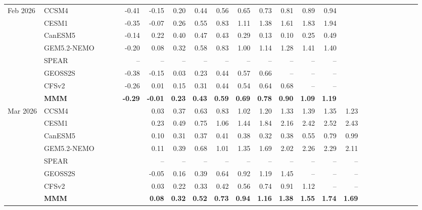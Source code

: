 \documentclass{article}
\begin{document}
\begin{longtable}{llrrrrrrrrrrrrrrrrrrrrrr}
\midrule
Feb 2026 & CCSM4 &  &  &  & -0.41 & -0.15 & 0.20 & 0.44 & 0.56 & 0.65 & 0.73 & 0.81 & 0.89 & 0.94 &  &  &  &  &  &  &  &  &  \\
 & CESM1 &  &  &  & -0.35 & -0.07 & 0.26 & 0.55 & 0.83 & 1.11 & 1.38 & 1.61 & 1.83 & 1.94 &  &  &  &  &  &  &  &  &  \\
 & CanESM5 &  &  &  & -0.14 & 0.22 & 0.40 & 0.47 & 0.43 & 0.29 & 0.13 & 0.10 & 0.25 & 0.49 &  &  &  &  &  &  &  &  &  \\
 & GEM5.2-NEMO &  &  &  & -0.20 & 0.08 & 0.32 & 0.58 & 0.83 & 1.00 & 1.14 & 1.28 & 1.41 & 1.40 &  &  &  &  &  &  &  &  &  \\
 & SPEAR &  &  &  & -- & -- & -- & -- & -- & -- & -- & -- & -- & -- &  &  &  &  &  &  &  &  &  \\
 & GEOSS2S &  &  &  & -0.38 & -0.15 & 0.03 & 0.23 & 0.44 & 0.57 & 0.66 & -- & -- & -- &  &  &  &  &  &  &  &  &  \\
 & CFSv2 &  &  &  & -0.26 & 0.01 & 0.15 & 0.31 & 0.44 & 0.54 & 0.64 & 0.68 & -- & -- &  &  &  &  &  &  &  &  &  \\
 & \textbf{MMM} &  &  &  & \textbf{-0.29} & \textbf{-0.01} & \textbf{0.23} & \textbf{0.43} & \textbf{0.59} & \textbf{0.69} & \textbf{0.78} & \textbf{0.90} & \textbf{1.09} & \textbf{1.19} &  &  &  &  &  &  &  &  &  \\
\midrule
Mar 2026 & CCSM4 &  &  &  &  & 0.03 & 0.37 & 0.63 & 0.83 & 1.02 & 1.20 & 1.33 & 1.39 & 1.35 & 1.23 &  &  &  &  &  &  &  &  \\
 & CESM1 &  &  &  &  & 0.23 & 0.49 & 0.75 & 1.06 & 1.44 & 1.84 & 2.16 & 2.42 & 2.52 & 2.43 &  &  &  &  &  &  &  &  \\
 & CanESM5 &  &  &  &  & 0.10 & 0.31 & 0.37 & 0.41 & 0.38 & 0.32 & 0.38 & 0.55 & 0.79 & 0.99 &  &  &  &  &  &  &  &  \\
 & GEM5.2-NEMO &  &  &  &  & 0.11 & 0.39 & 0.68 & 1.01 & 1.35 & 1.69 & 2.02 & 2.26 & 2.29 & 2.11 &  &  &  &  &  &  &  &  \\
 & SPEAR &  &  &  &  & -- & -- & -- & -- & -- & -- & -- & -- & -- & -- &  &  &  &  &  &  &  &  \\
 & GEOSS2S &  &  &  &  & -0.05 & 0.16 & 0.39 & 0.64 & 0.92 & 1.19 & 1.45 & -- & -- & -- &  &  &  &  &  &  &  &  \\
 & CFSv2 &  &  &  &  & 0.03 & 0.22 & 0.33 & 0.42 & 0.56 & 0.74 & 0.91 & 1.12 & -- & -- &  &  &  &  &  &  &  &  \\
 & \textbf{MMM} &  &  &  &  & \textbf{0.08} & \textbf{0.32} & \textbf{0.52} & \textbf{0.73} & \textbf{0.94} & \textbf{1.16} & \textbf{1.38} & \textbf{1.55} & \textbf{1.74} & \textbf{1.69} &  &  &  &  &  &  &  &  \\

\end{longtable}
\end{document}
